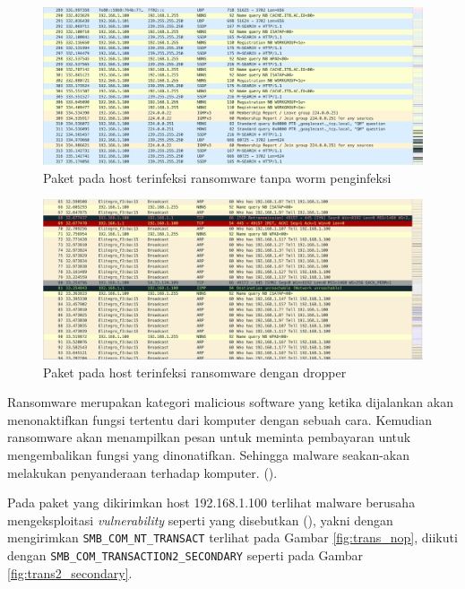 \begin{figure}[H]
	\centering
	\includegraphics[width=\textwidth]{resources/no_infect_action.png}
	\caption{Paket pada host terinfeksi ransomware tanpa worm penginfeksi}
	\label{fig:no_infect_action}
\end{figure}

\begin{figure}[H]
	\centering
	\includegraphics[width=\textwidth]{resources/infect_action.png}
	\caption{Paket pada host terinfeksi ransomware dengan dropper}
	\label{fig:infect_action}
\end{figure}

Ransomware merupakan kategori malicious software yang ketika dijalankan akan menonaktifkan fungsi tertentu dari komputer dengan sebuah cara. Kemudian ransomware akan menampilkan pesan untuk meminta pembayaran untuk mengembalikan fungsi yang dinonatifkan. Sehingga malware seakan-akan melakukan penyanderaan terhadap komputer. (\cite{o2012ransomware}).

Pada paket yang dikirimkan host 192.168.1.100 terlihat malware berusaha mengeksploitasi \textit{vulnerability} seperti yang disebutkan (\cite{islam2018smb}), yakni dengan mengirimkan \verb|SMB_COM_NT_TRANSACT| terlihat pada Gambar \ref{fig:trans_nop}, diikuti dengan \verb|SMB_COM_TRANSACTION2_SECONDARY| seperti pada Gambar \ref{fig:trans2_secondary}.

